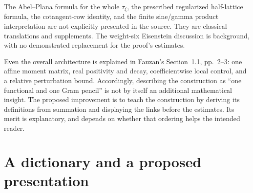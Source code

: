 \documentclass[11pt]{article}
\theoremstyle{definition}
\theoremstyle{remark}\newtheorem*{remark}{Remark}
\begin{document}
The Abel--Plana formula for the whole $\tau_\xi$, the prescribed regularized
half-lattice formula, the cotangent-row identity, and the finite sine/gamma
product interpretation are not explicitly presented in the source. They are
classical translations and supplements. The weight-six Eisenstein discussion
is background, with no demonstrated replacement for the proof's estimates.

Even the overall architecture is explained in Fauzan's Section~1.1,
pp.~2--3: one affine moment matrix, real positivity and decay, coefficientwise
local control, and a relative perturbation bound. Accordingly, describing the
construction as ``one functional and one Gram pencil'' is not by itself an
additional mathematical insight. The proposed improvement is to teach the
construction by deriving its definitions from summation and displaying the
links before the estimates. Its merit is explanatory, and depends on whether
that ordering helps the intended reader.

\section{A dictionary and a proposed presentation}
\end{document}
